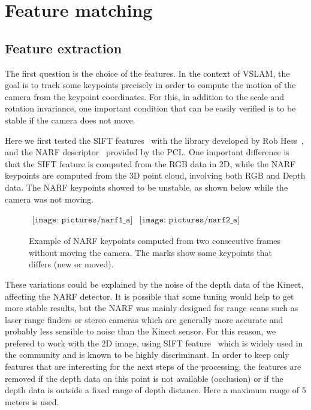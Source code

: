 \chapter{Feature matching}
\label{chap:features}

\section{Feature extraction}

The first question is the choice of the features. In the context of \gls{VSLAM}, the goal is to track some keypoints precisely in order to compute the motion of the camera from the keypoint coordinates. For this, in addition to the scale and rotation invariance, one important condition that can be easily verified is to be stable if the camera does not move. 

Here we first tested the \gls{SIFT} features~\cite{lowe_2004_sift} with the library developed by Rob Hess~\cite{hess_sift}, and the \gls{NARF} descriptor~\cite{steder10irosws} provided by the \gls{PCL}. One important difference is that the \gls{SIFT} feature is computed from the RGB data in 2D, while the \gls{NARF} keypoints are computed from the 3D point cloud, involving both RGB and Depth data.
The \gls{NARF} keypoints showed to be unstable, as shown below while the camera was not moving.

\begin{figure}[h]
\centering$
 \begin{array}{cc}
 \texttt{[image: pictures/narf1\_a]} &
 \texttt{[image: pictures/narf2\_a]}
 \end{array}$
\caption{Example of NARF keypoints computed from two consecutive frames without moving the camera. The marks show some keypoints that differs (new or moved).}
\end{figure}

These variations could be explained by the noise of the depth data of the Kinect, affecting the \gls{NARF} detector. It is possible that some tuning would help to get more stable results, but the \gls{NARF} was mainly designed for range scans such as laser range finders or stereo cameras which are generally more accurate and probably less sensible to noise than the Kinect sensor. For this reason, we prefered to work with the 2D image, using \gls{SIFT} feature~\cite{lowe_2004_sift} which is widely used in the community and is known to be highly discriminant. In order to keep only features that are interesting for the next steps of the processing, the features are removed if the depth data on this point is not available (occlusion) or if the depth data is outside a fixed range of depth distance. Here a maximum range of 5 meters is used.

